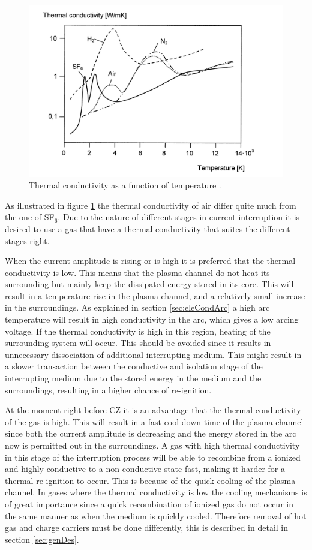 \documentclass[10pt,a4paper]{article}
\begin{document}
\begin{figure}[H]
\centering
\includegraphics[scale=0.8]{Bilder/Theory/thermalCond.png}
\caption{Thermal conductivity as a function of temperature \cite{bib:HVEbreak}.} \label{fig:tempConGas}
\end{figure}

As illustrated in figure \ref{fig:tempConGas} the thermal conductivity of air differ quite much from the one of SF$_6$. Due to the nature of different stages in current interruption it is desired to use a gas that have a thermal conductivity that suites the different stages right. 

When the current amplitude is rising or is high it is preferred that the thermal conductivity is low. This means that the plasma channel do not heat its surrounding but mainly keep the dissipated energy stored in its core. This will result in a temperature rise in the plasma channel, and a relatively small increase in the surroundings. As explained in section \ref{sec:eleCondArc} a high arc temperature will result in high conductivity in the arc, which gives a low arcing voltage. If the thermal conductivity is high in this region, heating of the surrounding system will occur. This should be avoided since it results in unnecessary dissociation of additional interrupting medium. This might result in a slower transaction between the conductive and isolation stage of the interrupting medium due to the stored energy in the medium and the surroundings, resulting in a higher chance of re-ignition.

At the moment right before CZ it is an advantage that the thermal conductivity of the gas is high. This will result in a fast cool-down time of the plasma channel since both the current amplitude is decreasing and the energy stored in the arc now is permitted out in the surroundings. A gas with high thermal conductivity in this stage of the interruption process will be able to recombine from a ionized and highly conductive to a non-conductive state fast, making it harder for a thermal re-ignition to occur. This is because of the quick cooling of the plasma channel. In gases where the thermal conductivity is low the cooling mechanisms is of great importance since a quick recombination of ionized gas do not occur in the same manner as when the medium is quickly cooled. Therefore removal of hot gas and charge carriers must be done differently, this is described in detail in section \ref{sec:genDes}.
\end{document}
